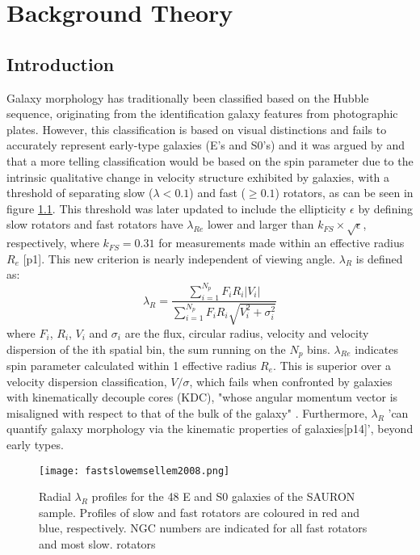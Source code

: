
\chapter{Background Theory}

\label{ch:background}

\section{Introduction}
Galaxy morphology has traditionally been classified based on the Hubble sequence, originating from the identification galaxy features from photographic plates. However, this classification is based on visual distinctions and fails to accurately represent early-type galaxies (E's and S0's) and it was argued by \cite{Cappellari2011} and \cite{Emsellem2011} that a more telling classification would be based on the spin parameter due to the intrinsic qualitative change in velocity structure exhibited by galaxies, with a threshold of separating slow ($\lambda<0.1$) and fast ($\geq0.1$) rotators, as can be seen in figure \ref{fig:morphsplit}. This threshold was later updated to include the ellipticity $\epsilon$ by defining slow rotators and fast rotators have $\lambda_{Re}$ lower and larger than $k_{FS} \times \sqrt{\epsilon}$, respectively, where $k_{FS} = 0.31$ for measurements made within an effective radius $R_{e}$ \cite{Emsellem2011}[p1]. This new criterion is nearly independent of viewing angle.
$\lambda_{R}$ is defined as\cite{sauron9}:
\begin{equation}
\lambda_{R} = \frac{\sum_{i=1}^{N_{p}} F_{i}R_{i}|V_{i}|}{\sum_{i=1}^{N_{p}}F_{i}R_{i}\sqrt{V_{i}^2+\sigma_{i}^2}}
\end{equation}
where $F_i$, $R_i$, $V_i$ and $σ_i$ are the flux, circular radius, velocity and velocity dispersion of the ith spatial bin, the sum running on the $N_p$ bins. $\lambda_{Re}$ indicates spin parameter calculated within 1 effective radius $R_{e}$.
This is superior over a velocity dispersion classification, $V/\sigma$, which fails when confronted by galaxies with kinematically decouple cores (KDC), "whose angular momentum vector is misaligned with respect to that of the bulk of the galaxy" \cite{mo_bosch_white_2010}. Furthermore, $\lambda_{R}$ 'can quantify galaxy morphology via the kinematic properties of galaxies\cite{Cortese2016}[p14]', beyond early types. 
\begin{figure}[h]
	\caption{Radial $\lambda_{R}$ profiles for the 48 E and S0 galaxies of the SAURON
	sample. Profiles of slow and fast rotators are coloured in red and blue, respectively.
	NGC numbers are indicated for all fast rotators and most slow.
	rotators \cite[p.6]{Emsellem2011}}
	\centering
	\texttt{[image: fastslowemsellem2008.png]}
	\label{fig:morphsplit}
\end{figure}

